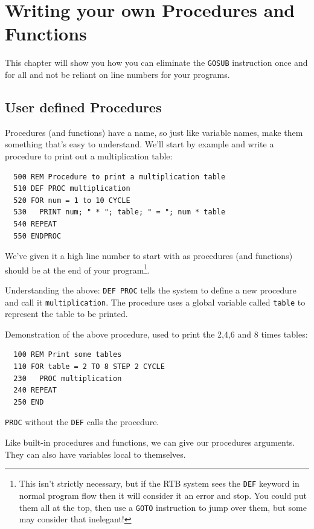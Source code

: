 \chapter{Writing your own Procedures and Functions}
This chapter will show you how you can eliminate the {\tt GOSUB}
instruction once and for all and not be reliant on line numbers
for your programs.

\section{User defined Procedures}
Procedures (and functions) have a name, so just like variable names,
make them something that's easy to understand. We'll start by example
and write a procedure to print out a multiplication table:
\begin{verbatim}
  500 REM Procedure to print a multiplication table
  510 DEF PROC multiplication
  520 FOR num = 1 to 10 CYCLE
  530   PRINT num; " * "; table; " = "; num * table
  540 REPEAT
  550 ENDPROC
\end{verbatim}
We've given it a high line number to start with as procedures (and
functions) should be at the end of your program\footnote{This isn't
strictly necessary, but if the RTB system sees the {\tt DEF} keyword in normal program flow
then it will consider it an error and stop. You could put them all at
the top, then use a {\tt GOTO} instruction to jump over them, but some
may consider that inelegant!}.

Understanding the above: {\tt DEF PROC} tells the system to define a
new procedure and call it {\tt multiplication}. The procedure
uses a global variable called {\tt table} to represent the 
table to be printed.

Demonstration of the above procedure, used to
print the 2,4,6 and 8 times tables:
\begin{verbatim}
  100 REM Print some tables
  110 FOR table = 2 TO 8 STEP 2 CYCLE
  230   PROC multiplication
  240 REPEAT
  250 END
\end{verbatim}
{\tt PROC} without the {\tt DEF} calls the procedure.

Like built-in procedures and functions, we can give our procedures
arguments. They can also have variables local to themselves.

